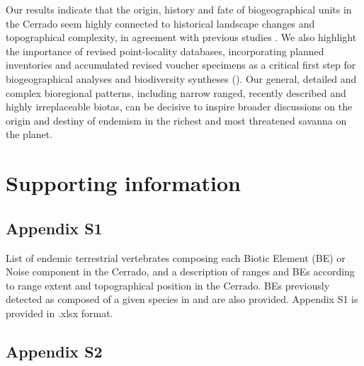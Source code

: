 \documentclass[12pt,openright,oneside,a4paper,english]{abntex2}
\begin{document}
Our results indicate that the origin, history and fate of biogeographical units in the Cerrado seem highly connected to historical landscape changes and topographical complexity, in agreement with previous studies \citep{Silva2002, Nogueira2011}. We also highlight the importance of revised point-locality databases, incorporating planned inventories and accumulated revised voucher specimens as a critical first step for biogeographical analyses and biodiversity syntheses (\citealp[see][]{Hausdorf2002, Nogueira2019}). Our general, detailed and complex bioregional patterns, including narrow ranged, recently described and highly irreplaceable biotas, can be decisive to inspire broader discussions on the origin and destiny of endemism in the richest and most threatened savanna on the planet.

\pagebreak

\section{Supporting information}\label{sec:supinfo-2}
\subsection*{Appendix S1}\label{sup:2-s1}
 
 List of endemic terrestrial vertebrates composing each Biotic Element (BE) or Noise component in the Cerrado, and a description of ranges and BEs according to range extent and topographical position in the Cerrado. BEs previously detected as composed of a given species in \citet{Nogueira2011} and \citet{Azevedo2016} are also provided. Appendix S1 is provided in .xlsx format.

\subsection*{Appendix S2}\label{sup:2-s2}
\end{document}
